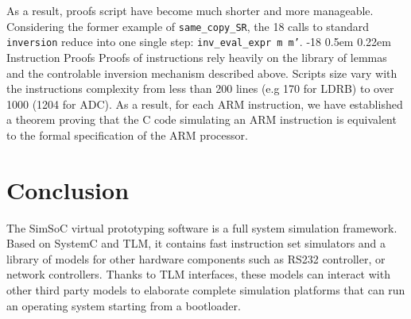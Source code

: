 \documentclass{llncs}
\makeatletter
\newcommand{\coqdockw}[1]{\texttt{#1}}
\newcommand{\inversion}{\coqdockw{inversion}\xspace}
\renewcommand\subsubsection{\@startsection{subsubsection}{3}{\z@}%
                       {-18\p@ \@plus -4\p@ \@minus -4\p@}%
                       {0.5em \@plus 0.22em}%
                       {\normalfont\normalsize\bfseries\boldmath}}
\makeatother
\begin{document}
As a result, proofs script have become much shorter and more manageable.
Considering the former example of \texttt{same\_copy\_SR},
the 18 calls to standard \inversion
reduce into one single step:
\texttt{inv\_eval\_expr~m~m'}.
\subsubsection{Instruction Proofs}
Proofs of instructions rely heavily on
the library of lemmas and the controlable inversion mechanism
described above.
Scripts size vary with the instructions complexity from less than 200 lines (e.g
170 for LDRB) to over 1000 (1204 for ADC).
As a result, for each ARM instruction,
we have established a theorem proving that the C code
simulating an ARM instruction is equivalent to the formal
specification of the ARM processor.


\section{Conclusion}
\label{conclusion}

The SimSoC virtual prototyping software is a full system simulation
framework. Based on SystemC and TLM, it contains fast instruction set
simulators and a library of models for other hardware components such
as RS232 controller, or network controllers. Thanks to TLM interfaces,
these models can interact with other third party models to elaborate
complete simulation platforms that can run an operating system
starting from a bootloader.
\end{document}
